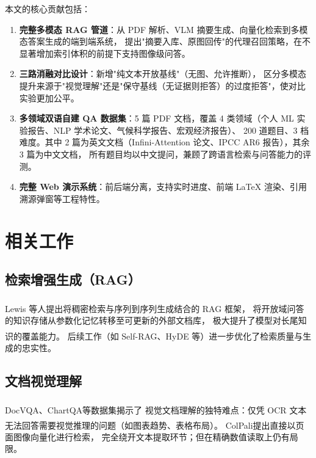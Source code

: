 ﻿\documentclass[UTF8, heading=true]{ctexart}
\newcommand{\upcite}[1]{\textsuperscript{\textsuperscript{\cite{#1}}}}
\begin{document}
本文的核心贡献包括：
\begin{enumerate}
    \item \textbf{完整多模态 RAG 管道}：从 PDF 解析、VLM 摘要生成、向量化检索到多模态答案生成的端到端系统，
          提出"摘要入库、原图回传"的代理召回策略，在不显著增加索引体积的前提下支持图像级问答。
    \item \textbf{三路消融对比设计}：新增"纯文本开放基线"（无图、允许推断），
          区分多模态提升来源于"视觉理解"还是"保守基线（无证据则拒答）的过度拒答"，使对比实验更加公平。
    \item \textbf{多领域双语自建 QA 数据集}：5 篇 PDF 文档，覆盖 4 类领域（个人 ML 实验报告、NLP 学术论文、气候科学报告、宏观经济报告）、
          200 道题目、3 档难度。其中 2 篇为英文文档（Infini-Attention 论文、IPCC AR6 报告），其余 3 篇为中文文档，
          所有题目均以中文提问，兼顾了跨语言检索与问答能力的评测。
    \item \textbf{完整 Web 演示系统}：前后端分离，支持实时进度、前端 LaTeX 渲染、引用溯源弹窗等工程特性。
\end{enumerate}

\section{相关工作}

\subsection{检索增强生成（RAG）}

Lewis 等人\upcite{lewis2020rag}提出将稠密检索与序列到序列生成结合的 RAG 框架，
将开放域问答的知识存储从参数化记忆转移至可更新的外部文档库，
极大提升了模型对长尾知识的覆盖能力。
后续工作（如 Self-RAG\upcite{selfrag2023}、HyDE 等）进一步优化了检索质量与生成的忠实性。

\subsection{文档视觉理解}

DocVQA\upcite{mathew2021docvqa}、ChartQA\upcite{masry2022chartqa}等数据集揭示了
视觉文档理解的独特难点：仅凭 OCR 文本无法回答需要视觉推理的问题（如图表趋势、表格布局）。
ColPali\upcite{faysse2025colpali}提出直接以页面图像向量化进行检索，
完全绕开文本提取环节；但在精确数值读取上仍有局限。
\end{document}
